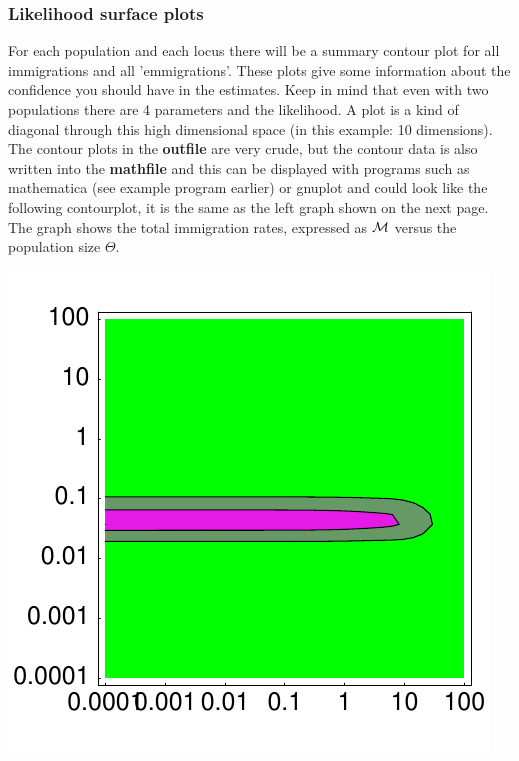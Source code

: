 \subsubsection{Likelihood surface plots}
For each population and each locus there will be a summary contour plot
for all immigrations and all 'emmigrations'. These plots give some information
about the confidence you should have in the estimates. Keep in mind that
even with two populations there are 4 parameters and the likelihood.
A plot is a kind of diagonal through this high dimensional space (in this
example: 10 dimensions). The contour plots in the \textbf{outfile} are very crude, but the contour data is also written into the \textbf{mathfile} and this can be displayed with programs such as mathematica (see example program earlier) or gnuplot and could look like the following contourplot, it is the same as the left graph shown on the next page. The graph shows the total immigration rates, expressed as $\mathcal{M}$ versus the population size $\Theta$.
\begin{center}
\begin{boxedminipage}{4in}
\includegraphics{mim/mathfilegraph}
\end{boxedminipage}
\end{center}
\newpage
